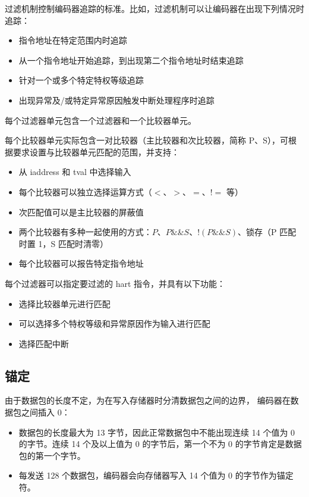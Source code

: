 \documentclass[main\_\_CN.tex]{subfiles}
\begin{document}
过滤机制控制编码器追踪的标准。比如，过滤机制可以让编码器在出现下列情况时追踪：
\begin{itemize}
    \item 指令地址在特定范围内时追踪
    \item 从一个指令地址开始追踪，到出现第二个指令地址时结束追踪
    \item 针对一个或多个特定特权等级追踪
    \item 出现异常及/或特定异常原因触发中断处理程序时追踪
\end{itemize}

每个过滤器单元包含一个过滤器和一个比较器单元。

每个比较器单元实际包含一对比较器（主比较器和次比较器，简称 P、S），可根据要求设置与比较器单元匹配的范围，并支持：

\begin{itemize}
    \item 从 iaddress 和 tval 中选择输入
    \item 每个比较器可以独立选择运算方式（$<$、$>$、$=$、$!=$ 等）
    \item 次匹配值可以是主比较器的屏蔽值
    \item 两个比较器有多种一起使用的方式：$P$、$P\&\&S$、$!(P\&\&S)$、锁存（P 匹配时置 1，S 匹配时清零）
    \item 每个比较器可以报告特定指令地址
\end{itemize}

每个过滤器可以指定要过滤的 hart 指令，并具有以下功能：
\begin{itemize}
    \item 选择比较器单元进行匹配
    \item 可以选择多个特权等级和异常原因作为输入进行匹配
    \item 选择匹配中断
\end{itemize}

\subsection{锚定}

由于数据包的长度不定，为在写入存储器时分清数据包之间的边界，\chipname{} 编码器在数据包之间插入 0：
\begin{itemize}
    \item 数据包的长度最大为 13 字节，因此正常数据包中不能出现连续 14 个值为 0 的字节。连续 14 个及以上值为 0 的字节后，第一个不为 0 的字节肯定是数据包的第一个字节。
    \item 每发送 128 个数据包，编码器会向存储器写入 14 个值为 0 的字节作为锚定符。
\end{itemize}
\end{document}
